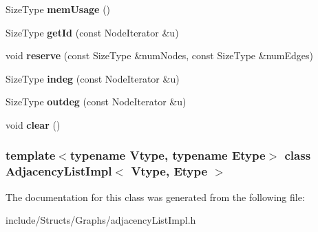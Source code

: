 \begin{DoxyCompactItemize}
\item 
\hypertarget{class_adjacency_list_impl_a9804655aa1492e459ad199c557ae25e9}{
SizeType {\bfseries memUsage} ()}
\label{class_adjacency_list_impl_a9804655aa1492e459ad199c557ae25e9}

\item 
\hypertarget{class_adjacency_list_impl_af4e01861da1ceadf00c5558fd0517023}{
SizeType {\bfseries getId} (const NodeIterator \&u)}
\label{class_adjacency_list_impl_af4e01861da1ceadf00c5558fd0517023}

\item 
\hypertarget{class_adjacency_list_impl_a6bff017d89b3992ed209534a851f9d9b}{
void {\bfseries reserve} (const SizeType \&numNodes, const SizeType \&numEdges)}
\label{class_adjacency_list_impl_a6bff017d89b3992ed209534a851f9d9b}

\item 
\hypertarget{class_adjacency_list_impl_aaa6738104589dd5fcaf8c9de0e864d32}{
SizeType {\bfseries indeg} (const NodeIterator \&u)}
\label{class_adjacency_list_impl_aaa6738104589dd5fcaf8c9de0e864d32}

\item 
\hypertarget{class_adjacency_list_impl_a9c91b7547481366c09c6143914fa9677}{
SizeType {\bfseries outdeg} (const NodeIterator \&u)}
\label{class_adjacency_list_impl_a9c91b7547481366c09c6143914fa9677}

\item 
\hypertarget{class_adjacency_list_impl_a0cdb3e8328cce90817f6e7233701e238}{
void {\bfseries clear} ()}
\label{class_adjacency_list_impl_a0cdb3e8328cce90817f6e7233701e238}

\end{DoxyCompactItemize}
\subsubsection*{template$<$typename Vtype, typename Etype$>$ class AdjacencyListImpl$<$ Vtype, Etype $>$}



The documentation for this class was generated from the following file:\begin{DoxyCompactItemize}
\item 
include/Structs/Graphs/adjacencyListImpl.h\end{DoxyCompactItemize}
